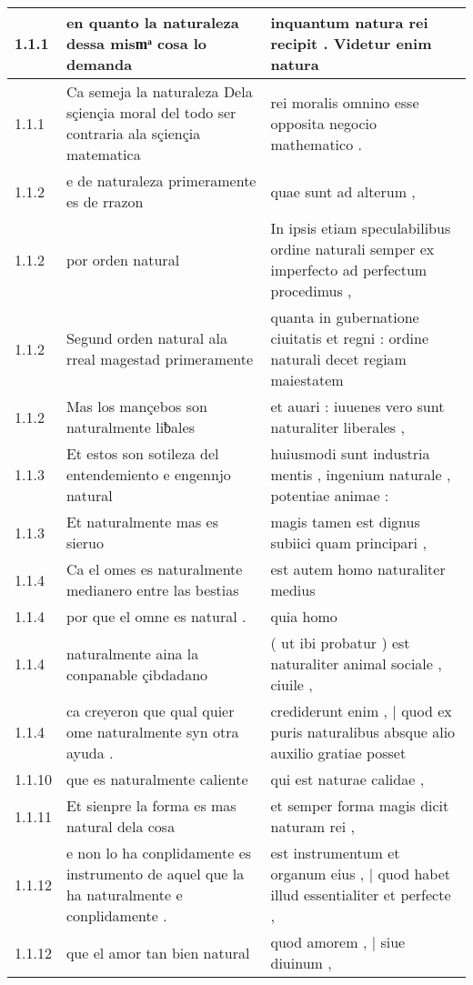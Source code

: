 \begin{tabular}{|p{1cm}|p{6.5cm}|p{6.5cm}|}

\hline
1.1.1 & en quanto la naturaleza dessa mismͣ cosa lo demanda & inquantum natura rei recipit . Videtur enim natura \\\hline
1.1.1 & Ca semeja la naturaleza Dela sçiençia moral del todo ser contraria ala sçiençia matematica & rei moralis omnino esse opposita negocio mathematico . \\\hline
1.1.2 & e de naturaleza primeramente es de rrazon & quae sunt ad alterum , \\\hline
1.1.2 & por orden natural & In ipsis etiam speculabilibus ordine naturali semper ex imperfecto ad perfectum procedimus , \\\hline
1.1.2 & Segund orden natural ala rreal magestad primeramente & quanta in gubernatione ciuitatis et regni : ordine naturali decet regiam maiestatem \\\hline
1.1.2 & Mas los mançebos son naturalmente liƀales & et auari : iuuenes vero sunt naturaliter liberales , \\\hline
1.1.3 & Et estos son sotileza del entendemiento e engennjo natural & huiusmodi sunt industria mentis , ingenium naturale , potentiae animae : \\\hline
1.1.3 & Et naturalmente mas es sieruo & magis tamen est dignus subiici quam principari , \\\hline
1.1.4 & Ca el omes es naturalmente medianero entre las bestias & est autem homo naturaliter medius \\\hline
1.1.4 & por que el omne es natural . & quia homo \\\hline
1.1.4 & naturalmente aina la conpanable çibdadano & ( ut ibi probatur ) est naturaliter animal sociale , ciuile , \\\hline
1.1.4 & ca creyeron que qual quier ome naturalmente syn otra ayuda . & crediderunt enim , | quod ex puris naturalibus absque alio auxilio gratiae posset \\\hline
1.1.10 & que es naturalmente caliente & qui est naturae calidae , \\\hline
1.1.11 & Et sienpre la forma es mas natural dela cosa & et semper forma magis dicit naturam rei , \\\hline
1.1.12 & e non lo ha conplidamente es instrumento de aquel que la ha naturalmente e conplidamente . & est instrumentum et organum eius , | quod habet illud essentialiter et perfecte , \\\hline
1.1.12 & que el amor tan bien natural & quod amorem , | siue diuinum , \\\hline

\end{tabular}
